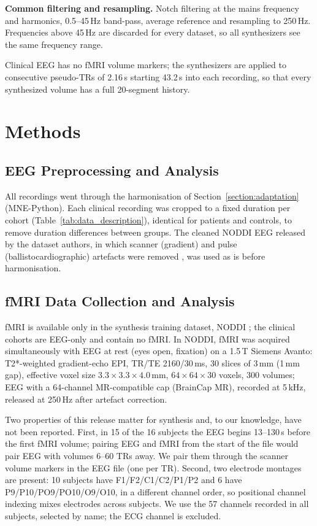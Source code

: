 \documentclass{article}
\begin{document}
\noindent\textbf{Common filtering and resampling.} Notch filtering at the mains frequency and harmonics, 0.5--45\,Hz band-pass, average reference and resampling to 250\,Hz. Frequencies above 45\,Hz are discarded for every dataset, so all synthesizers see the same frequency range.

Clinical EEG has no fMRI volume markers; the synthesizers are applied to consecutive pseudo-TRs of 2.16\,s starting 43.2\,s into each recording, so that every synthesized volume has a full 20-segment history.

\section{Methods}\label{section:methods}

\subsection{EEG Preprocessing and Analysis}

All recordings went through the harmonisation of Section~\ref{section:adaptation} (MNE-Python). Each clinical recording was cropped to a fixed duration per cohort (Table~\ref{tab:data_description}), identical for patients and controls, to remove duration differences between groups. The cleaned NODDI EEG released by the dataset authors, in which scanner (gradient) and pulse (ballistocardiographic) artefacts were removed \cite{dataset_01}, was used as is before harmonisation.

\subsection{fMRI Data Collection and Analysis}\label{section:fmri_data}

fMRI is available only in the synthesis training dataset, NODDI \cite{dataset_01,deligianni2016}; the clinical cohorts are EEG-only and contain no fMRI. In NODDI, fMRI was acquired simultaneously with EEG at rest (eyes open, fixation) on a 1.5\,T Siemens Avanto: T2*-weighted gradient-echo EPI, TR/TE 2160/30\,ms, 30 slices of 3\,mm (1\,mm gap), effective voxel size $3.3\times3.3\times4.0$\,mm, $64\times64\times30$ voxels, 300 volumes; EEG with a 64-channel MR-compatible cap (BrainCap MR), recorded at 5\,kHz, released at 250\,Hz after artefact correction.

Two properties of this release matter for synthesis and, to our knowledge, have not been reported. First, in 15 of the 16 subjects the EEG begins 13--130\,s before the first fMRI volume; pairing EEG and fMRI from the start of the file would pair EEG with volumes 6--60 TRs away. We pair them through the scanner volume markers in the EEG file (one per TR). Second, two electrode montages are present: 10 subjects have F1/F2/C1/C2/P1/P2 and 6 have P9/P10/PO9/PO10/O9/O10, in a different channel order, so positional channel indexing mixes electrodes across subjects. We use the 57 channels recorded in all subjects, selected by name; the ECG channel is excluded.
\end{document}
